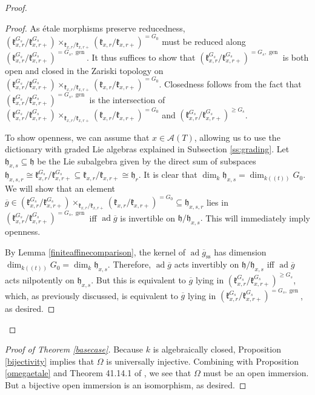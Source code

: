 \documentclass[12pt]{article}
\newcommand{\on}{\operatorname}
\theoremstyle{remark}
\begin{document}
\begin{proof}
\begin{proof}
As \'etale morphisms preserve reducedness, $(\mathfrak{k}_{x,r}^{G_s}/\mathfrak{k}_{x,r+}^{G_s})\times_{\mathfrak{k}_{x,r}/\mathfrak{k}_{x,r+}}(\mathfrak{k}_{x,r}/\mathfrak{k}_{x,r+})^{=G_0}$ must be reduced along $(\mathfrak{k}_{x,r}^{G_s}/\mathfrak{k}_{x,r+}^{G_s})^{=G_s,\on{gen}}$. It thus suffices to show that $(\mathfrak{k}_{x,r}^{G_s}/\mathfrak{k}_{x,r+}^{G_s})^{=G_s,\on{gen}}$ is both open and closed in the Zariski topology on $(\mathfrak{k}_{x,r}^{G_s}/\mathfrak{k}_{x,r+}^{G_s})\times_{\mathfrak{k}_{x,r}/\mathfrak{k}_{x,r+}}(\mathfrak{k}_{x,r}/\mathfrak{k}_{x,r+})^{=G_0}$. Closedness follows from the fact that $(\mathfrak{k}_{x,r}^{G_s}/\mathfrak{k}_{x,r+}^{G_s})^{=G_s,\on{gen}}$ is the intersection of $(\mathfrak{k}_{x,r}^{G_s}/\mathfrak{k}_{x,r+}^{G_s})\times_{\mathfrak{k}_{x,r}/\mathfrak{k}_{x,r+}}(\mathfrak{k}_{x,r}/\mathfrak{k}_{x,r+})^{=G_0}$ and $(\mathfrak{k}_{x,r}^{G_s}/\mathfrak{k}_{x,r+}^{G_s})^{\geq G_s}$.

To show openness, we can assume that $x\in\mathcal{A}(T)$, allowing us to use the dictionary with graded Lie algebras explained in Subsection \ref{ss:grading}. Let $\mathfrak{h}_{x,s}\subseteq\mathfrak{h}$ be the Lie subalgebra given by the direct sum of subspaces $\mathfrak{h}_{x,s,r}\cong\mathfrak{k}_{x,r}^{G_s}/\mathfrak{k}_{x,r+}^{G_s}\subseteq\mathfrak{k}_{x,r}/\mathfrak{k}_{x,r+}\cong\mathfrak{h}_r.$ It is clear that $\dim_k\mathfrak{h}_{x,s}=\dim_{k((t))}G_0$. We will show that an element $\overline{g}\in(\mathfrak{k}_{x,r}^{G_s}/\mathfrak{k}_{x,r+}^{G_s})\times_{\mathfrak{k}_{x,r}/\mathfrak{k}_{x,r+}}(\mathfrak{k}_{x,r}/\mathfrak{k}_{x,r+})^{=G_0}\subseteq\mathfrak{h}_{x,s,r}$ lies in $(\mathfrak{k}_{x,r}^{G_s}/\mathfrak{k}_{x,r+}^{G_s})^{=G_s,\on{gen}}$ iff $\on{ad}\overline{g}$ is invertible on $\mathfrak{h}/\mathfrak{h}_{x,s}.$ This will immediately imply openness.

By Lemma \ref{finiteaffinecomparison}, the kernel of $\on{ad}\overline{g}_{\on{ss}}$ has dimension $\dim_{k((t))}G_0=\dim_k\mathfrak{h}_{x,s}.$ Therefore, $\on{ad}\overline{g}$ acts invertibly on $\mathfrak{h}/\mathfrak{h}_{x,s}$ iff $\on{ad}\overline{g}$ acts nilpotently on $\mathfrak{h}_{x,s}.$ But this is equivalent to $\overline{g}$ lying in $(\mathfrak{k}_{x,r}^{G_s}/\mathfrak{k}_{x,r+}^{G_s})^{\geq G_s}$, which, as previously discussed, is equivalent to $\overline{g}$ lying in $(\mathfrak{k}_{x,r}^{G_s}/\mathfrak{k}_{x,r+}^{G_s})^{=G_s,\on{gen}}$, as desired.
\end{proof}
\end{proof}

\begin{proof}[Proof of Theorem \ref{basecase}]
Because $k$ is algebraically closed, Proposition \ref{bijectivity} implies that $\Omega$ is universally injective. 	Combining with Proposition \ref{omegaetale} and Theorem 41.14.1 of \cite[\href{https://stacks.math.columbia.edu/tag/025G}{Theorem 025G}]{stacks-project}, we see that $\Omega$ must be an open immersion. But a bijective open immersion is an isomorphism, as desired.
\end{proof}
\printbibliography
\end{document}
